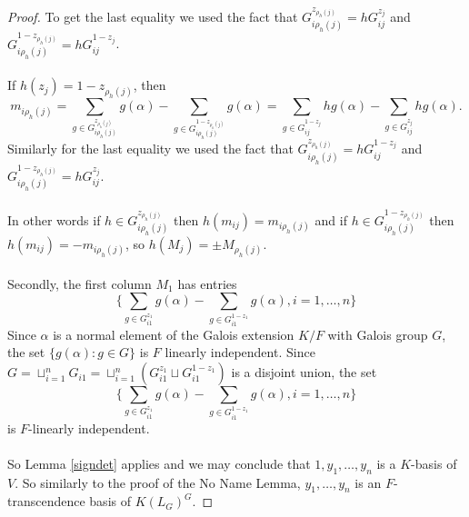 \documentclass{article}
\theoremstyle{plain}
\theoremstyle{definition}
\begin{document}
\begin{proof}
To get the last equality we used the fact that $G^{z_{\rho_h(j)}}_{i\rho_{h}(j)}= hG^{z_j}_{ij}$ and $G^{1- z_{\rho_h(j)}}_{i\rho_h(j)}= hG^{1-z_j}_{ij}$.\\
\\
If  $h(z_j) = 1- z_{\rho_h(j)}$, then 
$$m_{i\rho_h(j)} =  \sum_{g\in G^{z_{\rho_h(j)}}_{i\rho_h(j)}}g(\alpha) -\sum_{g\in G^{1-z_{\rho_h(j)}}_{i\rho_h(j)}}g(\alpha) = \sum_{g\in G^{1-z_j}_{ij}}hg(\alpha) -\sum_{g\in G^{z_j}_{ij}}hg(\alpha).$$
Similarly for the last equality we used the fact that $G^{z_{\rho_h(j)}}_{i\rho_{h}(j)}= hG^{1-z_j}_{ij}$ and $G^{1- z_{\rho_h(j)}}_{i\rho_h(j)}= hG^{z_j}_{ij}$.\\
\\
In other words if $h \in G^{z_{\rho_h(j)}}_{i\rho_h(j)}$ then $h(m_{ij}) = m_{i\rho_h(j)}$ and if $h \in G^{1-z_{\rho_h(j)}}_{i\rho_h(j)}$ then $h(m_{ij}) = -m_{i\rho_h(j)}$, so $h(M_j) = \pm M_{\rho_h(j)}$.
\\
\\
Secondly, the first column $M_1$ has entries 
$$\lbrace\sum_{g \in G^{z_1}_{i1}}g(\alpha)- \sum_{g \in G^{1- z_1}_{i1}}g(\alpha), i = 1, \ldots,n\rbrace$$
Since $\alpha$ is a normal element of the Galois extension $K/F$ with Galois group $G$, the set $\lbrace g(\alpha): g \in G \rbrace$ is $F$ linearly independent. Since $G = \sqcup^n_{i =1}G_{i1}= \sqcup^n_{i =1}(G^{z_1}_{i1} \sqcup G^{1-z_1}_{i1}) $ is a disjoint union, the set 
$$\lbrace\sum_{g \in G^{z_1}_{i1}}g(\alpha)- \sum_{g \in G^{1- z_1}_{i1}}g(\alpha), i = 1, \ldots,n\rbrace$$
is $F$-linearly independent.\\
\\
So Lemma \ref{signdet} applies and we may conclude that $1, y_1, \ldots, y_n$ is a $K$-basis of $V$. So similarly to the proof of the No Name Lemma, $y_1, \ldots, y_n$ is an $F$-transcendence basis of $K(L_G)^G$.

\end{proof}
\end{document}
